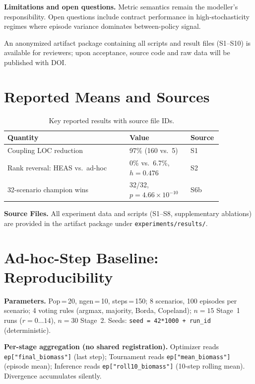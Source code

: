 \documentclass{wscpaperproc}
\begin{document}
\textbf{Limitations and open questions.} Metric semantics remain the modeller's responsibility. Open
questions include contract performance in high-stochasticity regimes where
episode variance dominates between-policy signal.

An anonymized artifact package containing all scripts and result files (S1--S10)
is available for reviewers; upon acceptance, source code and raw data will be
published with DOI.

\appendix
\section{Reported Means and Sources}

\begin{table}[ht]
\caption{Key reported results with source file IDs.}
\label{tab:appendix-results}
\centering\small
\begin{tabular}{p{0.52\linewidth}p{0.26\linewidth}p{0.08\linewidth}}
\toprule
Quantity & Value & Source \\
\midrule
Coupling LOC reduction & 97\% (160 vs.\ 5) & S1 \\
Rank reversal: HEAS vs.\ ad-hoc & 0\% vs.\ 6.7\%, $h\!=\!0.476$ & S2 \\
32-scenario champion wins & 32/32, $p\!=\!4.66\!\times\!10^{-10}$ & S6b \\
\bottomrule
\end{tabular}
\end{table}

\noindent\textbf{Source Files.} All experiment data and scripts (S1--S8, supplementary ablations)
are provided in the artifact package under \texttt{experiments/results/}.

\section{Ad-hoc-Step Baseline: Reproducibility}
\label{app:adhoc}

\textbf{Parameters.} Pop\,=\,20, ngen\,=\,10, steps\,=\,150; 8 scenarios,
100 episodes per scenario; 4 voting rules (argmax, majority, Borda, Copeland);
$n\!=\!15$ Stage~1 runs ($r\!=\!0\ldots14$), $n\!=\!30$ Stage~2. Seeds:
\texttt{seed = 42*1000 + run\_id} (deterministic).

\textbf{Per-stage aggregation (no shared registration).} Optimizer reads
\texttt{ep["final\_biomass"]} (last step); Tournament reads
\texttt{ep["mean\_biomass"]} (episode mean); Inference reads
\texttt{ep["roll10\_biomass"]} (10-step rolling mean). Divergence accumulates silently.
\end{document}
